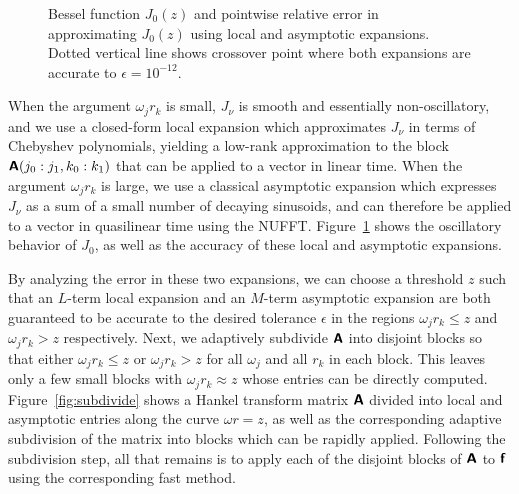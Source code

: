 \begin{figure}[!t]
\begin{subfigure}[b]{0.45\textwidth}
  \end{subfigure}
  \caption{Bessel function $J_0(z)$ and pointwise relative error in
  approximating $J_0(z)$ using local and asymptotic expansions. Dotted vertical
  line shows crossover point where both expansions are accurate to $\epsilon =
  10^{-12}$.}
  \label{fig:two-expansions}
\end{figure}

When the argument $\omega_j r_k$ is small, $J_\nu$ is smooth and essentially
non-oscillatory, and we use a closed-form local expansion which approximates
$J_\nu$ in terms of Chebyshev polynomials, yielding a low-rank approximation to
the block $\bm{\mathsf{A}}(j_0:j_1, k_0:k_1)$ that can be applied to a vector in linear
time. When the argument $\omega_j r_k$ is large, we use a classical asymptotic
expansion which expresses $J_\nu$ as a sum of a small number of decaying
sinusoids, and can therefore be applied to a vector in quasilinear time using
the NUFFT. Figure~\ref{fig:two-expansions} shows the oscillatory behavior of
$J_0$, as well as the accuracy of these local and asymptotic expansions.

By analyzing the error in these two expansions, we can choose a threshold $z$
such that an $L$-term local expansion and an $M$-term asymptotic expansion are
both guaranteed to be accurate to the desired tolerance $\epsilon$ in the
regions $\omega_j r_k \leq z$ and $\omega_j r_k > z$ respectively. Next, we
adaptively subdivide $\bm{\mathsf{A}}$ into disjoint blocks so that either $\omega_j r_k
\leq z$ or $\omega_j r_k > z$ for all $\omega_j$ and all $r_k$ in each block.
This leaves only a few small blocks with $\omega_j r_k \approx z$ whose entries
can be directly computed. Figure~\ref{fig:subdivide} shows a Hankel transform
matrix $\bm{\mathsf{A}}$ divided into local and asymptotic entries along the curve
$\omega r = z$, as well as the corresponding adaptive subdivision of the matrix
into blocks which can be rapidly applied. Following the subdivision step, all
that remains is to apply each of the disjoint blocks of $\bm{\mathsf{A}}$ to $\bm{\mathsf{f}}$
using the corresponding fast method.

